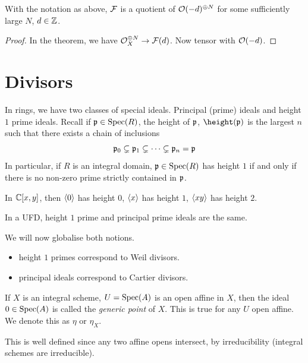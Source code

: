 \documentclass{article}
\begin{document}
\begin{corollary}
    With the notation as above, \(\mathcal{F}\) is a quotient of \(\mathcal{O}(-d)^{\oplus N}\) for some sufficiently large \(N\), \(d \in \mathbb{Z}\).
\end{corollary}

\begin{proof}
    In the theorem, we have \(\mathcal{O}_X^{\oplus N} \to \mathcal{F}(d)\). Now tensor with \(\mathcal{O}(-d)\).
\end{proof}

\section{Divisors}

In rings, we have two classes of special ideals. Principal (prime) ideals and height \(1\) prime ideals. Recall if \(\mathfrak{p} \in \operatorname{Spec}(R)\), the height of \(\mathfrak{p}\), \(\height(\mfp)\) is the largest \(n\) such that there exists a chain of inclusions
\[\mathfrak{p}_0 \subsetneq \mathfrak{p}_1 \subsetneq \cdots \subsetneq \mathfrak{p}_n = \mathfrak{p}\]
In particular, if \(R\) is an integral domain, \(\mathfrak{p} \in \operatorname{Spec}(R)\) has height \(1\) if and only if there is no non-zero prime strictly contained in \(\mathfrak{p}\).

\begin{example}
    In \(\mathbb{C}[x, y]\), then \(\left\langle 0 \right\rangle\) has height 0, \(\left\langle x \right\rangle\) has height \(1\), \(\left\langle xy \right\rangle\) has height \(2\).
\end{example}

\begin{remark}
    In a UFD, height \(1\) prime and principal prime ideals are the same.
\end{remark}

We will now globalise both notions.
\begin{itemize}
    \item height \(1\) primes correspond to Weil divisors.
    \item principal ideals correspond to Cartier divisors.
\end{itemize}

\begin{definition}
    If \(X\) is an integral scheme, \(U = \operatorname{Spec}(A)\) is an open affine in \(X\), then the ideal \(0 \in \operatorname{Spec}(A)\) is called the \emph{generic point} of \(X\). This is true for any \(U\) open affine. We denote this as \(\eta\) or \(\eta_X\).
\end{definition}

This is well defined since any two affine opens intersect, by irreducibility (integral schemes are irreducible).
\end{document}

